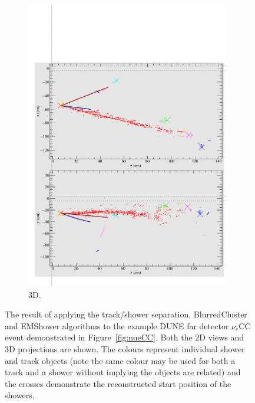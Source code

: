 \begin{figure}
\begin{subfigure}[t]{0.48\linewidth}
    \includegraphics[width=0.98\textwidth]{NuECCTrackShower3D.pdf}
    \caption{3D.}
    \label{fig:nueCCRecon3D}
  \end{subfigure}
  \caption[The result of applying the track/shower separation, BlurredCluster and EMShower algorithms to the example DUNE far detector $\nu_e$CC event demonstrated in Figure~\ref{fig:nueCC}.]{The result of applying the track/shower separation, BlurredCluster and EMShower algorithms to the example DUNE far detector $\nu_e$CC event demonstrated in Figure~\ref{fig:nueCC}.  Both the 2D views and 3D projections are shown.  The colours represent individual shower and track objects (note the same colour may be used for both a track and a shower without implying the objects are related) and the crosses demonstrate the reconstructed start position of the showers.}
  \label{fig:nueCCRecon}
\end{figure}

